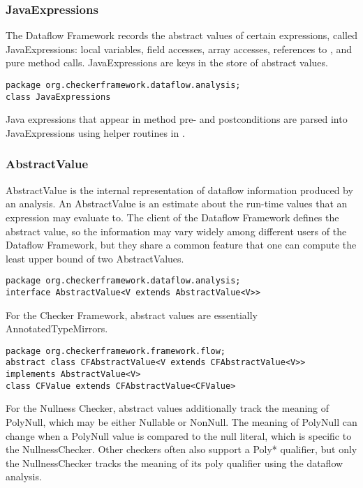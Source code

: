 \subsubsection{JavaExpressions}
\label{sec:flow_expressions_class}

The Dataflow Framework records the abstract values of certain
expressions, called JavaExpressions: local variables, field accesses,
array accesses, references to , and pure method calls.
JavaExpressions are keys in the store of abstract values.

\begin{verbatim}
package org.checkerframework.dataflow.analysis;
class JavaExpressions
\end{verbatim}

Java expressions that appear in method pre- and postconditions are
parsed into JavaExpressions using helper routines in
.


\subsubsection{AbstractValue}
\label{sec:abstract_value_classes}

AbstractValue is the internal representation of dataflow information
produced by an analysis.  An AbstractValue is an estimate about the
run-time values that an expression may evaluate to.  The client of the
Dataflow Framework defines the abstract value, so the information may
vary widely among different users of the Dataflow Framework, but they
share a common feature that one can compute the least upper bound of
two AbstractValues.

\begin{verbatim}
package org.checkerframework.dataflow.analysis;
interface AbstractValue<V extends AbstractValue<V>>
\end{verbatim}

For the Checker Framework, abstract values are essentially
AnnotatedTypeMirrors.

\begin{verbatim}
package org.checkerframework.framework.flow;
abstract class CFAbstractValue<V extends CFAbstractValue<V>> implements AbstractValue<V>
class CFValue extends CFAbstractValue<CFValue>
\end{verbatim}

For the Nullness Checker, abstract values additionally track the
meaning of PolyNull, which may be either Nullable or NonNull.  The
meaning of PolyNull can change when a PolyNull value is compared to
the null literal, which is specific to the NullnessChecker.  Other
checkers often also support a Poly* qualifier, but only the
NullnessChecker tracks the meaning of its poly qualifier using the
dataflow analysis.

